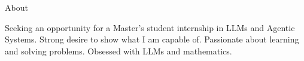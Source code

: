 \begin{rubric}{About}
\noentry{~}

\begin{minipage}[t]{\textwidth}
Seeking an opportunity for a Master's student internship in LLMs and Agentic Systems. Strong desire to show what I am capable of.
Passionate about learning and solving problems. Obsessed with LLMs and mathematics.
\end{minipage}

\end{rubric}


